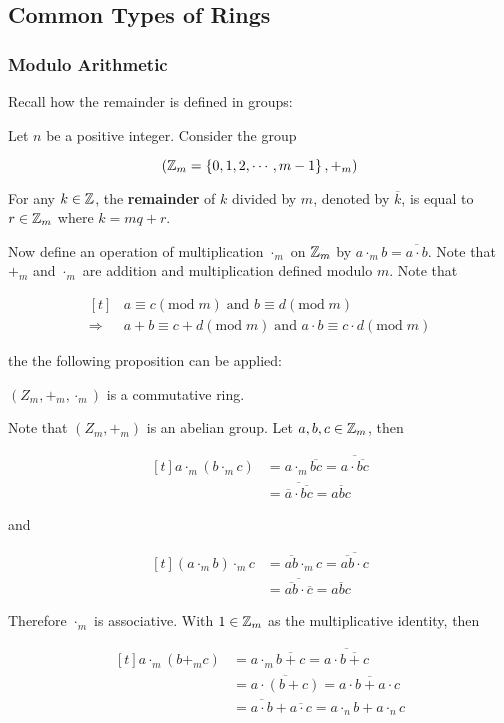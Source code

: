 \documentclass[a4paper,12pt]{article}
\begin{document}
\subsection{Common Types of Rings}
\subsubsection{Modulo Arithmetic}
Recall how the remainder is defined in groups:\n

\begin{dft}
  Let $n$ be a positive integer. Consider the group

  $$\left( \mathbb{Z}_{m}=\left\{ 0,1,2,\cdots,m-1\right\},+_{m}\right)$$\s

  For any $k\in\mathbb{Z}$, the \textbf{remainder} of $k$ divided by $m$, denoted by $\overline{k}$, is equal to $r\in\mathbb{Z}_{m}$ where $k=mq+r$.
\end{dft}\n

Now define an operation of multiplication $\cdot_{m}$ on $\mathbb{Z}_{m}$ by $a\cdot_{m}b=\overline{a\cdot b}$. Note that $+_{m}$ and $\cdot_{m}$ are addition and multiplication defined modulo $m$. Note that

$$\begin{aligned}[t]
  &a\equiv c(\mathrm{mod}\; m)\;\text{and }b\equiv d(\mathrm{mod}\; m)\\
  \Rightarrow&a+b\equiv c+d(\mathrm{mod}\; m)\;\text{and }a\cdot b\equiv c\cdot d(\mathrm{mod}\; m)
\end{aligned}$$\s

the the following proposition can be applied:\n

\begin{pst}
  $(Z_{m},+_{m},\cdot_{m})$ is a commutative ring.\n

  \prf Note that $(Z_{m},+_{m})$ is an abelian group. Let $a,b,c\in\mathbb{Z}_{m}$, then

  $$\begin{aligned}[t]
    a\cdot_{m}(b\cdot_{m}c)&=a\cdot_{m}\overline{bc}=\overline{a\cdot\overline{bc}}\\
    &=\overline{\overline{a}\cdot\overline{bc}}=\overline{abc}
  \end{aligned}$$\s

  and

  $$\begin{aligned}[t]
    (a\cdot_{m}b)\cdot_{m}c&=\overline{ab}\cdot_{m}c=\overline{\overline{ab}\cdot c}\\
    &=\overline{\overline{ab}\cdot\overline{c}}=\overline{abc}
  \end{aligned}$$\s

  Therefore $\cdot_{m}$ is associative. With $1\in\mathbb{Z}_{m}$ as the multiplicative identity, then

  $$\begin{aligned}[t]
    a\cdot_{m}(b+_{m}c)&=a\cdot_{m}\overline{b+c}=\overline{a\cdot\overline{b+c}}\\
    &=\overline{a\cdot(b+c)}=\overline{a\cdot b+a\cdot c}\\
    &=\overline{a\cdot b}+\overline{a\cdot c}=a\cdot_{n}b+a\cdot_{n}c
  \end{aligned}$$
\end{pst}
\end{document}

